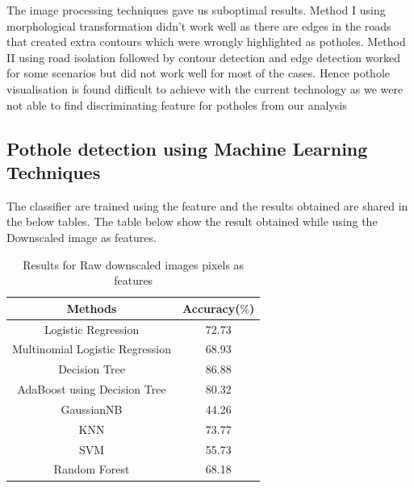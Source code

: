 \documentclass[journal]{IEEEtran}
\begin{document}
The image processing techniques gave us suboptimal results. Method I using morphological transformation didn't work well as there are edges in the roads that created extra contours which were wrongly highlighted as potholes. Method II using road isolation followed by contour detection and edge detection worked for some scenarios but did not work well for most of the cases. Hence pothole visualisation is found difficult to achieve with the current technology as we were not able to find discriminating feature for potholes from our analysis

\subsection{Pothole detection using Machine Learning Techniques}

The classifier are trained using the feature and the results obtained are shared in the below tables.
The table below show the result obtained while using the Downscaled image as features.
\begin{center}
\begin{table}[h!]
\centering
\begin{tabular}{ |c|c| } 
 \hline
 \rowcolor{gray}
 Methods & Accuracy($\%$)  \\ 
 \hline
 Logistic Regression & 72.73 \\
 \hline
 Multinomial Logistic Regression & 68.93\\
 \hline
 Decision Tree & 86.88 \\ 
 \hline
 AdaBoost using Decision Tree & 80.32  \\ 
 \hline
 GaussianNB & 44.26 \\
 \hline
 KNN & 73.77\\
 \hline
 SVM & 55.73\\
 \hline
 Random Forest & 68.18\\
 \hline
\end{tabular}
\caption{Results for Raw downscaled images pixels as features}
\label{table:1}
\end{table}
\end{center}

\vspace{0.5cm}
\end{document}
